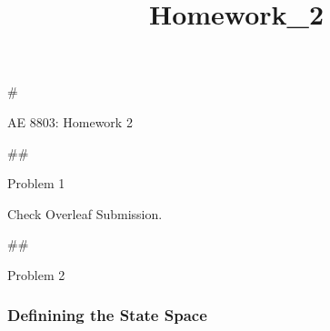 \documentclass[11pt]{article}
\title{Homework\_2}
\begin{document}
    
    
    \maketitle
    
    

    
    \#

AE 8803: Homework 2

    \#\#

Problem 1

    Check Overleaf Submission.

    \#\#

Problem 2

    \hypertarget{definining-the-state-space}{%
\subsubsection{Definining the State
Space}\label{definining-the-state-space}}
\end{document}
